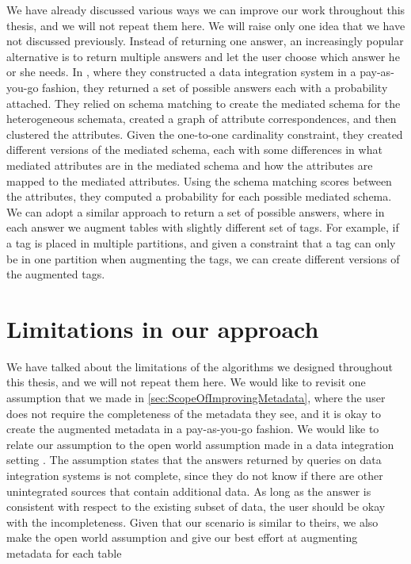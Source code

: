 We have already discussed various ways we can improve our work throughout this thesis, and we will not repeat them here. We will raise only one idea that we have not discussed previously. Instead of returning one answer, an increasingly popular alternative is to return multiple answers and let the user choose which answer he or she needs. In \cite{ilprints851}, where they constructed a data integration system in a pay-as-you-go fashion, they returned a set of possible answers each with a probability attached. They relied on schema matching to create the mediated schema for the heterogeneous schemata, created a graph of attribute correspondences, and then clustered the attributes. Given the one-to-one cardinality constraint, they created different versions of the mediated schema, each with some differences in what mediated attributes are in the mediated schema and how the attributes are mapped to the mediated attributes. Using the schema matching scores between the attributes, they computed a probability for each possible mediated schema. We can adopt a similar approach to return a set of possible answers, where in each answer we augment tables with slightly different set of tags. For example, if a tag is placed in multiple partitions, and given a constraint that a tag can only be in one partition when augmenting the tags, we can create different versions of the augmented tags.

\section{Limitations in our approach}
\label{sec:LimitationsInOurApproach}

We have talked about the limitations of the algorithms we designed throughout this thesis, and we will not repeat them here. We would like to revisit one assumption that we made in \autoref{sec:ScopeOfImprovingMetadata}, where the user does not require the completeness of the metadata they see, and it is okay to create the augmented metadata in a pay-as-you-go fashion. We would like to relate our assumption to the open world assumption made in a data integration setting \cite{Doan2001Reconciling}. The assumption states that the answers returned by queries on data integration systems is not complete, since they do not know if there are other unintegrated sources that contain additional data. As long as the answer is consistent with respect to the existing subset of data, the user should be okay with the incompleteness. Given that our scenario is similar to theirs, we also make the open world assumption and give our best effort at augmenting metadata for each table

